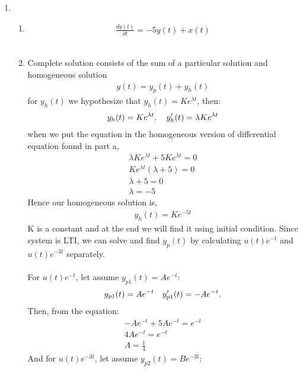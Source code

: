 \documentclass[10pt,a4paper, margin=1in]{article}
\begin{document}
\begin{enumerate}
\item %
    \begin{enumerate}
    \item %
    \begin{gather*}
        \frac{dy(t)}{dt} = -5y(t)+x(t)
    \end{gather*}
    \\
    \item %
    Complete solution consists of the sum of a particular solution and homogeneous solution 
    \begin{gather*}
        y(t) = y_p(t)+y_h(t)
    \end{gather*}
    for $y_h(t)$ we hypothesize that $ y_h(t)=Ke^{\lambda t}$, then:
    \begin{gather*}
        y_h(t)=Ke^{\lambda t},\text{\quad}  y'_h(t) = \lambda Ke^{\lambda t}
    \end{gather*}
    when we put the equation in the homogeneous version of differential equation found in part a, 
    \begin{gather*}
        \lambda Ke^{\lambda t} +5Ke^{\lambda t} = 0\\
        Ke^{\lambda t}(\lambda +5)=0\\
        \lambda +5=0 \\
        \lambda=-5
    \end{gather*}
    Hence our homogeneous solution is, 
    \begin{gather*}
        y_h(t)=Ke^{-5t}    
    \end{gather*}
    K is a constant and at the end we will find it using initial condition. Since system is LTI, we can solve and find $y_p(t)$ by calculating $u(t)e^{-t}$ and $u(t)e^{-3t}$ separately.\\ \\
    For $u(t)e^{-t}$, let assume $y_{p1}(t)=Ae^{-t}$:
    \begin{gather*}
        y_{p1}(t)=Ae^{-t} \text{\quad }  y_{p1}'(t)=-Ae^{-t}.
    \end{gather*}
     Then, from the equation: 
    \begin{gather*}
        -Ae^{-t}+5Ae^{-t}=e^{-t} \\
        4Ae^{-t}=e^{-t} \\
        A=\frac{1}{4}
    \end{gather*}
    And for $u(t)e^{-3t}$, let assume $y_{p2}(t)=Be^{-3t}$: 
    \begin{gather*}

\end{gather*}
\end{enumerate}
\end{enumerate}
\end{document}
